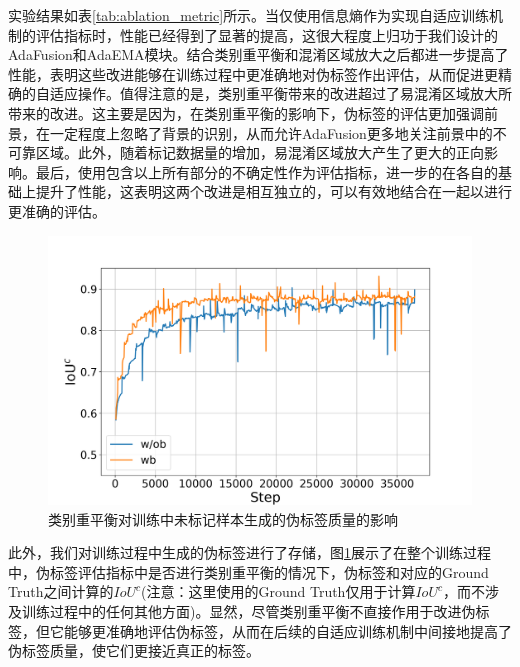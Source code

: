 \documentclass[lang=chs, degree=master, blindreview=false, adobe=false]{yanputhesis}
\begin{document}
实验结果如表\ref{tab:ablation_metric}所示。当仅使用信息熵作为实现自适应训练机制的评估指标时，性能已经得到了显著的提高，这很大程度上归功于我们设计的AdaFusion和AdaEMA模块。结合类别重平衡和混淆区域放大之后都进一步提高了性能，表明这些改进能够在训练过程中更准确地对伪标签作出评估，从而促进更精确的自适应操作。值得注意的是，类别重平衡带来的改进超过了易混淆区域放大所带来的改进。这主要是因为，在类别重平衡的影响下，伪标签的评估更加强调前景，在一定程度上忽略了背景的识别，从而允许AdaFusion更多地关注前景中的不可靠区域。此外，随着标记数据量的增加，易混淆区域放大产生了更大的正向影响。最后，使用包含以上所有部分的不确定性作为评估指标，进一步的在各自的基础上提升了性能，这表明这两个改进是相互独立的，可以有效地结合在一起以进行更准确的评估。

\begin{figure}[!htbp]
  \centering
  \includegraphics[scale=0.35]{images/AdAwob_unIoU.png}
  \caption{
      类别重平衡对训练中未标记样本生成的伪标签质量的影响
  }
  \label{fig:Adawob_unIOU}
\end{figure}
此外，我们对训练过程中生成的伪标签进行了存储，图\ref{fig:Adawob_unIOU}展示了在整个训练过程中，伪标签评估指标中是否进行类别重平衡的情况下，伪标签和对应的Ground Truth之间计算的$IoU^c$(注意：这里使用的Ground Truth仅用于计算$IoU^c$，而不涉及训练过程中的任何其他方面)。显然，尽管类别重平衡不直接作用于改进伪标签，但它能够更准确地评估伪标签，从而在后续的自适应训练机制中间接地提高了伪标签质量，使它们更接近真正的标签。
\end{document}
